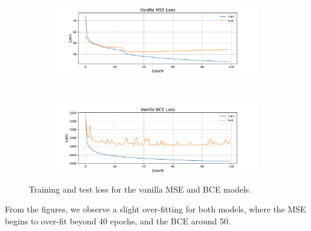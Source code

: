 \begin{figure}[htb]
    \centering
    \begin{subfigure}[b]{\textwidth}
        \centering
        \captionsetup{justification=centering}
        \includegraphics[width=0.99\textwidth]{figures/8_/1_final_MSE_plain.pdf}
        \label{fig:1_final_MSE_plain}
    \end{subfigure} \\
    \begin{subfigure}[b]{\textwidth}
        \centering
        \captionsetup{justification=centering}
        \includegraphics[width=0.99\textwidth]{figures/8_/4_final_BCE_plain.pdf}
        \label{fig:4_final_BCE_plain}
    \end{subfigure} 
    \caption{Training and test loss for the vanilla MSE and BCE models.}
    \label{fig:8_vanilla_vae}
\end{figure}
From the figures, we observe a slight over-fitting for both models, where the MSE begins to over-fit beyond 40 epochs, and the BCE around 50. 

